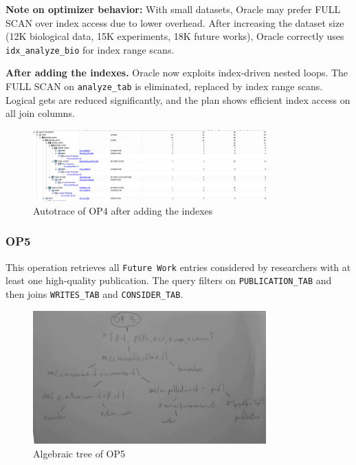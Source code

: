 \documentclass[11pt,a4paper]{article}
\begin{document}
\textbf{Note on optimizer behavior:} With small datasets, Oracle may prefer FULL SCAN over index access due to lower overhead. After increasing the dataset size (12K biological data, 15K experiments, 18K future works), Oracle correctly uses \texttt{idx\_analyze\_bio} for index range scans.

\textbf{After adding the indexes.} Oracle now exploits index-driven nested loops. The FULL SCAN on \texttt{analyze\_tab} is eliminated, replaced by index range scans. Logical gets are reduced significantly, and the plan shows efficient index access on all join columns.

\begin{figure}[H]
  \centering
  \includegraphics[width=0.8\textwidth]{img/op4_autotrace_after.png}
  \caption{Autotrace of OP4 after adding the indexes}
\end{figure}

\subsubsection*{OP5}

This operation retrieves all \texttt{Future Work} entries considered by researchers with at least one high-quality publication. The query filters on \texttt{PUBLICATION\_TAB} and then joins \texttt{WRITES\_TAB} and \texttt{CONSIDER\_TAB}.  

\begin{figure}[H]
  \centering
  \includegraphics[width=0.8\textwidth]{img/op5_algebra.png}
  \caption{Algebraic tree of OP5}
\end{figure}
\end{document}
